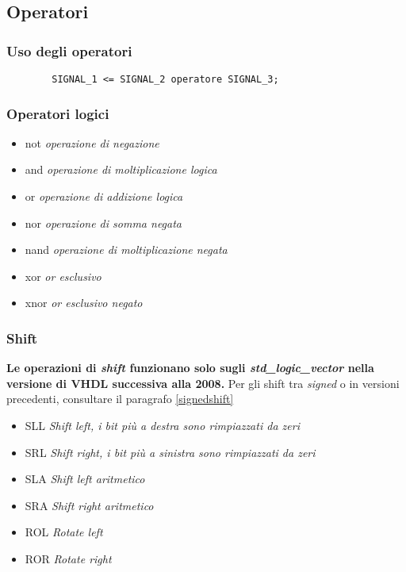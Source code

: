 \documentclass{article}
\begin{document}
\subsection{Operatori}
\subsubsection{Uso degli operatori}
\begin{verbatim}
	    SIGNAL_1 <= SIGNAL_2 operatore SIGNAL_3;
\end{verbatim}

\subsubsection{Operatori logici}
\begin{itemize}
	\item not \textit{operazione di negazione}
	\item and \textit{operazione di moltiplicazione logica}
	\item or \textit{operazione di addizione logica}
	\item nor \textit{operazione di somma negata}
	\item nand \textit{operazione di moltiplicazione negata}
	\item xor \textit{or esclusivo}
	\item xnor \textit{or esclusivo negato}
\end{itemize}

\newpage

\subsubsection{Shift}

\textbf{Le operazioni di \textit{shift} funzionano solo sugli \textit{std\_logic\_vector} nella versione di VHDL successiva alla 2008.} Per gli shift tra \textit{signed} o in versioni precedenti, consultare il paragrafo \ref{signedshift}

\begin{itemize}
	\item SLL \textit{Shift left, i bit più a destra sono rimpiazzati da zeri}
	\item SRL \textit{Shift right, i bit più a sinistra sono rimpiazzati da zeri}
	\item SLA \textit{Shift left aritmetico}
	\item SRA \textit{Shift right aritmetico}
	\item ROL \textit{Rotate left}
	\item ROR \textit{Rotate right}
\end{itemize}
\end{document}
